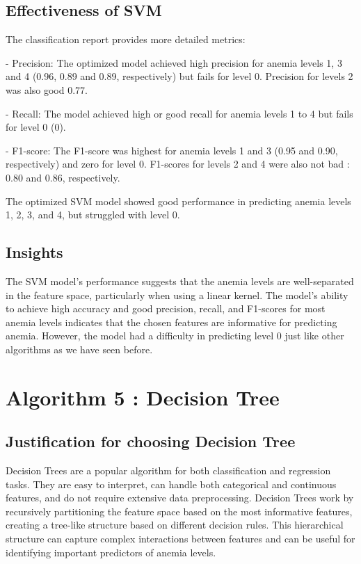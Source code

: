 \subsection{Effectiveness of SVM}


The classification report provides more detailed metrics:

- Precision: The optimized model achieved high precision for anemia levels 1, 3 and 4 (0.96, 0.89 and 0.89, respectively) but fails for level 0. Precision for levels 2 was also good 0.77.

- Recall: The model achieved high or good recall for anemia levels 1 to 4 but fails for level 0 (0).

- F1-score: The F1-score was highest for anemia levels 1 and 3 (0.95 and 0.90, respectively) and zero for level 0. F1-scores for levels 2 and 4 were also not bad : 0.80 and 0.86, respectively.

The optimized SVM model showed good performance in predicting anemia levels 1, 2, 3, and 4, but struggled with level 0.

\subsection{Insights }

The SVM model's performance suggests that the anemia levels are well-separated in the feature space, particularly when using a linear kernel. The model's ability to achieve high accuracy and good precision, recall, and F1-scores for most anemia levels indicates that the chosen features are informative for predicting anemia. However, the model had a difficulty in predicting level 0 just like other algorithms as we have seen before.

\section{Algorithm 5 : Decision Tree}

\subsection{Justification for choosing Decision Tree}


Decision Trees are a popular algorithm for both classification and regression tasks. They are easy to interpret, can handle both categorical and continuous features, and do not require extensive data preprocessing. Decision Trees work by recursively partitioning the feature space based on the most informative features, creating a tree-like structure based on different decision rules. This hierarchical structure can capture complex interactions between features and can be useful for identifying important predictors of anemia levels.

